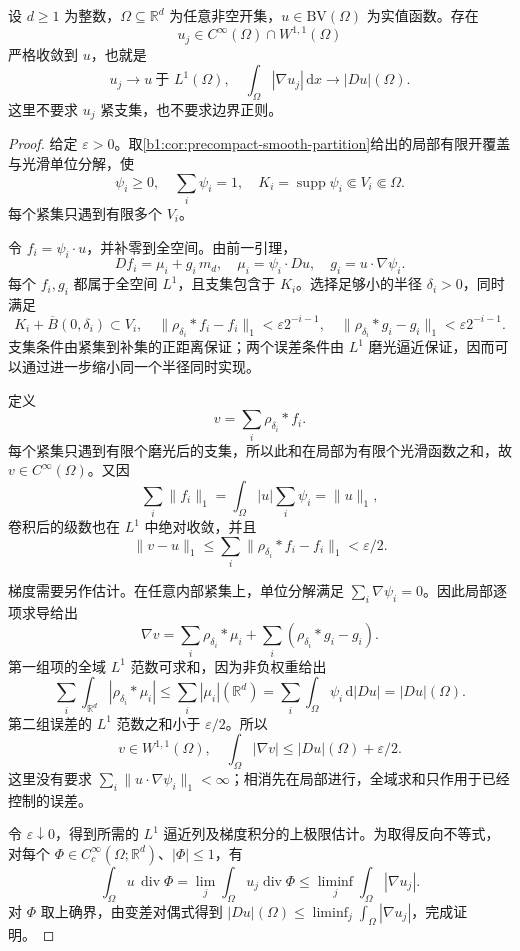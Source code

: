 \begin{theorem}\label{b1:thm:bv-strict-approximation}
设 \(d\ge1\) 为整数，\(\Omega\subseteq\mathbb R^d\) 为任意非空开集，\(u\in \mathrm{BV}(\Omega)\) 为实值函数。存在
\[
 u_j\in C^\infty(\Omega)\cap W^{1,1}(\Omega)
\]
严格收敛到 \(u\)，也就是
\[
 u_j\to u\ \text{于 }L^1(\Omega),\quad
 \int_\Omega|\nabla u_j|\,\mathrm dx\longrightarrow|Du|(\Omega).
\]
这里不要求 \(u_j\) 紧支集，也不要求边界正则。
\end{theorem}
\begin{proof}
给定 \(\varepsilon>0\)。取\cref{b1:cor:precompact-smooth-partition}给出的局部有限开覆盖与光滑单位分解，使
\[
 \psi_i\geq0,\quad \sum_i\psi_i=1,\quad
 K_i=\operatorname{supp}\psi_i\Subset V_i\Subset\Omega.
\]
每个紧集只遇到有限多个 \(V_i\)。

令 \(f_i=\psi_i\cdot u\)，并补零到全空间。由前一引理，
\[
 Df_i=\mu_i+g_i\,m_d,\quad
 \mu_i=\psi_i\cdot Du,\quad g_i=u\cdot\nabla\psi_i.
\]
每个 \(f_i,g_i\) 都属于全空间 \(L^1\)，且支集包含于 \(K_i\)。选择足够小的半径 \(\delta_i>0\)，同时满足
\[
 K_i+\overline B(0,\delta_i)\subset V_i,\quad
 \|\rho_{\delta_i}*f_i-f_i\|_1<\varepsilon2^{-i-1},\quad
 \|\rho_{\delta_i}*g_i-g_i\|_1<\varepsilon2^{-i-1}.
\]
支集条件由紧集到补集的正距离保证；两个误差条件由 \(L^1\) 磨光逼近保证，因而可以通过进一步缩小同一个半径同时实现。

定义
\[
 v=\sum_i\rho_{\delta_i}*f_i.
\]
每个紧集只遇到有限个磨光后的支集，所以此和在局部为有限个光滑函数之和，故 \(v\in C^\infty(\Omega)\)。又因
\[
 \sum_i\|f_i\|_1=\int_\Omega|u|\sum_i\psi_i=\|u\|_1,
\]
卷积后的级数也在 \(L^1\) 中绝对收敛，并且
\[
 \|v-u\|_1
 \leq\sum_i\|\rho_{\delta_i}*f_i-f_i\|_1<\varepsilon/2.
\]

梯度需要另作估计。在任意内部紧集上，单位分解满足
\(\sum_i\nabla\psi_i=0\)。因此局部逐项求导给出
\begin{equation}\label{b1:eq:bv-partition-commutator}
 \nabla v
 =\sum_i\rho_{\delta_i}*\mu_i
       +\sum_i(\rho_{\delta_i}*g_i-g_i).
\end{equation}
第一组项的全域 \(L^1\) 范数可求和，因为非负权重给出
\[
 \sum_i\int_{\mathbb R^d}|\rho_{\delta_i}*\mu_i|
 \leq\sum_i|\mu_i|(\mathbb R^d)
 =\sum_i\int_\Omega\psi_i\,\mathrm d|Du|
 =|Du|(\Omega).
\]
第二组误差的 \(L^1\) 范数之和小于 \(\varepsilon/2\)。所以
\[
 v\in W^{1,1}(\Omega),\quad
 \int_\Omega|\nabla v|\leq|Du|(\Omega)+\varepsilon/2.
\]
这里没有要求 \(\sum_i\|u\cdot\nabla\psi_i\|_1<\infty\)；相消先在局部进行，全域求和只作用于已经控制的误差。

令 \(\varepsilon\downarrow0\)，得到所需的 \(L^1\) 逼近列及梯度积分的上极限估计。为取得反向不等式，对每个
\(\Phi\in C_c^\infty(\Omega;\mathbb R^d)\)、\(|\Phi|\leq1\)，有
\[
 \int_\Omega u\,\operatorname{div}\Phi
 =\lim_j\int_\Omega u_j\operatorname{div}\Phi
 \leq\liminf_j\int_\Omega|\nabla u_j|.
\]
对 \(\Phi\) 取上确界，由变差对偶式得到
\(|Du|(\Omega)\leq\liminf_j\int_\Omega|\nabla u_j|\)，完成证明。
\end{proof}

